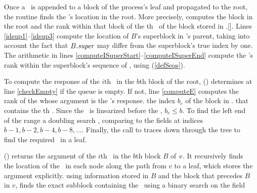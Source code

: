 Once a \dequeue\ is appended to a block of the process's leaf and propagated to the root,
the  routine finds the \dequeue's location in the root.
More precisely, 
computes the block in the root and the rank
within that block  of the th \dequeue\ of the block  stored in .[].
Lines \ref{idsup1}--\ref{idsup3} compute the location of $B$'s superblock in 's parent, taking into account the fact that $B.\mbox{\textit{super}}$ may differ from the superblock's true index by one.
The arithmetic in lines \ref{computeISuperStart}--\ref{computeISuperEnd} compute the \dequeue's 
rank within the superblock's sequence of \dequeues, using  (\ref{defSeqs}).


To compute the response of the $i$th \dequeue\ in the $b$th block
of the root, () determines at line \ref{checkEmpty} if the queue is empty.
If not, line \ref{computeE} computes the rank  of the
 whose argument is the \dequeue's response. 
the index $b_e$ of the block in . that contains 
the th \enqueue.
Since the \enqueue\ is linearized before the \dequeue, $b_e\leq b$.  To find the left end of the range  a doubling search \cite{BY76}, comparing  to the  fields at indices $b-1, b-2, b-4, b-8, \ldots$.
Finally, the call to   traces down through the tree to find the required \enqueue\ in a leaf.

() returns the argument of the
$i$th \enqueue\ in the $b$th block $B$ of  $\mbox{\textnormal{\textit{v}}}$. 
It recursively finds the location of the \enqueue\ in each node along the path from $v$ to a leaf, which stores the argument explicitly.
using information stored
in $B$ and the block that precedes $B$ in $v$,
finds the exact subblock containing the \enqueue\ using a binary search on the 
field 




